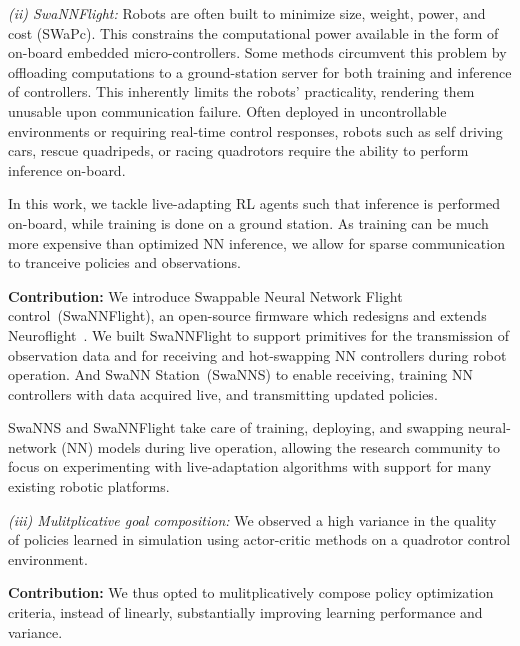 \documentclass[letterpaper, 10 pt, conference]{ieeeconf} %
\newcommand{\firmwarelong}{Swappable Neural Network Flight control}
\newcommand{\firmware}{SwaNNFlight}
\newcommand{\framework}{SwaNNS}
\newcommand{\frameworklong}{SwaNN Station}
\begin{document}
    \textit{(ii) \firmware{}:}
    Robots are often built to minimize size, weight, power, and cost (SWaPc).
    This constrains the computational power available in the form of on-board embedded micro-controllers.
    Some methods circumvent this problem by offloading computations to a ground-station server for both training and inference of controllers.
    This inherently limits the robots' practicality, rendering them unusable upon communication failure.
    Often deployed in uncontrollable environments or requiring real-time control responses, robots such as self driving cars, rescue quadripeds, or racing quadrotors require the ability to perform inference on-board.
    
    In this work, we tackle live-adapting RL agents such that inference is performed on-board, while training is done on a ground station.
    As training can be much more expensive than optimized NN inference, we allow for sparse communication to tranceive policies and observations.
    
    \noindent\textbf{Contribution:} We introduce \firmwarelong{}~(\firmware{}), an open-source firmware which redesigns and extends Neuroflight~\cite{NFori,NFv2}.
    We built \firmware{} to support primitives for the transmission of observation data and for receiving and hot-swapping NN controllers during robot operation.
    And \frameworklong{}~(\framework{}) to enable receiving, training NN controllers with data acquired live, and transmitting updated policies.
    
    \framework{} and \firmware{} take care of training, deploying, and swapping neural-network (NN) models during live operation, allowing the research community to focus on experimenting with live-adaptation algorithms with support for many existing robotic platforms.
    
    \textit{(iii) Mulitplicative goal composition:} We observed a high variance in the quality of policies learned in simulation using actor-critic methods on a quadrotor control environment.
    
    \noindent\textbf{Contribution:} We thus opted to mulitplicatively compose policy optimization criteria, instead of linearly, substantially improving learning performance and variance.
    



\end{document}

